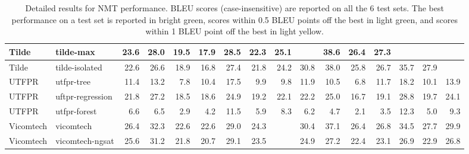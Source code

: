 \begin{table*}
\begin{center}
\begin{tabular}{|l|l|rrrrrrr|rrrrrrr|}
Tilde & tilde-max & 23.6 & 28.0 & 19.5 & 17.9 & 28.5 & 22.3 & 25.1 & \cellcolor{lightyellow}{31.2} & 38.6 & 26.4 & 27.3 & \cellcolor{lightgreen}{36.3} & \cellcolor{lightyellow}{28.6} & \cellcolor{lightyellow}{30.3} \\ \hline
Tilde & tilde-isolated & 22.6 & 26.6 & 18.9 & 16.8 & 27.4 & 21.8 & 24.2 & 30.8 & 38.0 & 25.8 & 26.7 & 35.7 & 27.9 & \cellcolor{lightyellow}{30.4} \\ \hline
UTFPR & utfpr-tree & 11.4 & 13.2 & 7.8 & 10.4 & 17.5 & 9.9 & 9.8 & 11.9 & 10.5 & 6.8 & 11.7 & 18.2 & 10.1 & 13.9 \\ \hline
UTFPR & uftpr-regression & 21.8 & 27.2 & 18.5 & 18.6 & 24.9 & 19.2 & 22.1 & 22.2 & 25.0 & 16.7 & 19.1 & 28.8 & 19.7 & 24.1 \\ \hline
UTFPR & utfpr-forest & 6.6 & 6.5 & 2.9 & 4.2 & 11.5 & 5.9 & 8.3 & 6.2 & 4.7 & 2.1 & 3.5 & 12.3 & 5.0 & 9.3 \\ \hline
Vicomtech & vicomtech & 26.4 & 32.3 & 22.6 & 22.6 & 29.0 & 24.3 & \cellcolor{lightyellow}{27.4} & 30.4 & 37.1 & 26.4 & 26.8 & 34.5 & 27.7 & 29.9 \\ \hline
Vicomtech & vicomtech-ngsat & 25.6 & 31.2 & 21.8 & 20.7 & 29.1 & 23.5 & \cellcolor{lightyellow}{27.6} & 24.9 & 27.2 & 22.4 & 23.1 & 26.9 & 22.9 & 26.8 \\ \hline
\end{tabular}
\end{center}
\caption{Detailed results for NMT performance. BLEU scores (case-insensitive) are reported on all the 6 test sets. The best performance on a test set is reported in bright green, scores within 0.5 BLEU points off the best in light green, and scores within 1 BLEU point off the best in light yellow.}
\label{tab:results-by-test-set-nmt}
\end{table*}
